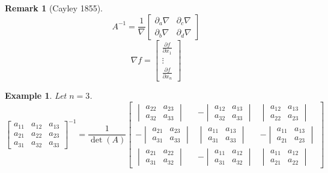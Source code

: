 \documentclass{article}
\newtheorem{example}{Example}  \numberwithin{example}{section}
\newtheorem{remark}{Remark}  \numberwithin{remark}{section}
\begin{document}
\begin{remark}[Cayley 1855]
  \[ A^{-1} = \frac{1}{\nabla} \begin{bmatrix} \partial_a \nabla & \partial_c \nabla \\ \partial_b \nabla & \partial_d \nabla \end{bmatrix} \]
  \[ \nabla f = \begin{bmatrix} \frac{\partial f}{\partial x_1} \\ \vdots \\ \frac{\partial f}{\partial x_n} \end{bmatrix} \]
\end{remark}

\begin{example}
  Let $n=3$.
  \[
    \begin{bmatrix}
      a_{11} & a_{12} & a_{13} \\
      a_{21} & a_{22} & a_{23} \\
      a_{31} & a_{32} & a_{33}
    \end{bmatrix}^{-1}
    = \frac{1}{\det(A)}
    \begin{bmatrix}
      \begin{vmatrix} a_{22} & a_{23} \\ a_{32} & a_{33} \end{vmatrix} & -\begin{vmatrix} a_{12} & a_{13} \\ a_{32} & a_{33} \end{vmatrix} & \begin{vmatrix} a_{12} & a_{13} \\ a_{22} & a_{23} \end{vmatrix} \\
      -\begin{vmatrix} a_{21} & a_{23} \\ a_{31} & a_{33} \end{vmatrix} & \begin{vmatrix} a_{11} & a_{13} \\ a_{31} & a_{33} \end{vmatrix} & -\begin{vmatrix} a_{11} & a_{13} \\ a_{21} & a_{23} \end{vmatrix} \\
      \begin{vmatrix} a_{21} & a_{22} \\ a_{31} & a_{32} \end{vmatrix} & -\begin{vmatrix} a_{11} & a_{12} \\ a_{31} & a_{32} \end{vmatrix} & \begin{vmatrix} a_{11} & a_{12} \\ a_{21} & a_{22} \end{vmatrix}
    \end{bmatrix}
  \]
\end{example}
\end{document}
